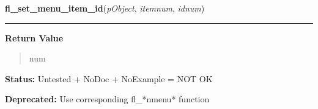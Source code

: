     \label{xformslib:library:fl_set_menu_item_id}

    \vspace{0.5ex}

\hspace{.8\funcindent}\begin{boxedminipage}{\funcwidth}

    \raggedright \textbf{fl\_set\_menu\_item\_id}(\textit{pObject}, \textit{itemnum}, \textit{idnum})

    \vspace{-1.5ex}

    \rule{\textwidth}{0.5\fboxrule}
\setlength{\parskip}{2ex}
\setlength{\parskip}{1ex}
      \textbf{Return Value}
    \vspace{-1ex}

      \begin{quote}
      num

      \end{quote}

\textbf{Status:} Untested + NoDoc + NoExample = NOT OK



\textbf{Deprecated:} Use corresponding fl\_*nmenu* function



    \end{boxedminipage}

    \label{xformslib:library:fl_create_nmenu}

    \vspace{0.5ex}

